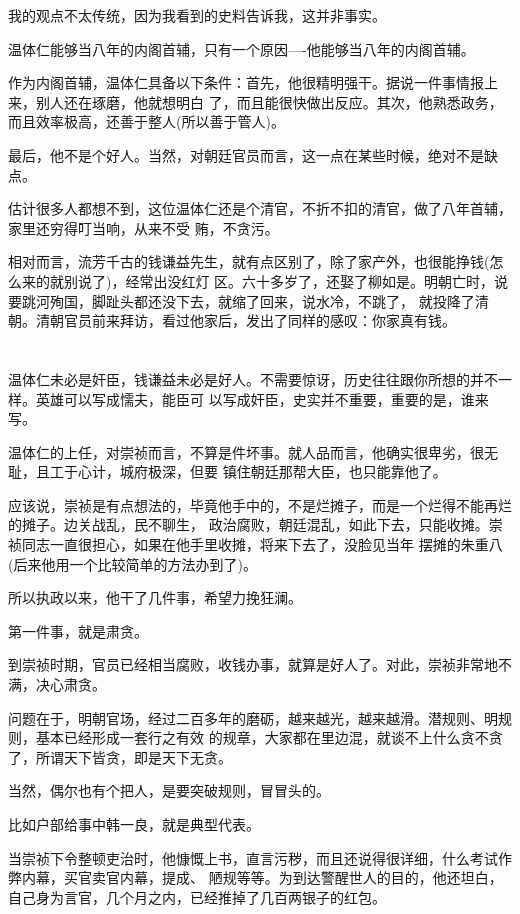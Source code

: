 \documentclass[11pt,a4paper,onecolumn]{article}
\begin{document}
我的观点不太传统，因为我看到的史料告诉我，这并非事实。

温体仁能够当八年的内阁首辅，只有一个原因----他能够当八年的内阁首辅。

作为内阁首辅，温体仁具备以下条件：首先，他很精明强干。据说一件事情报上来，别人还在琢磨，他就想明白
了，而且能很快做出反应。其次，他熟悉政务，而且效率极高，还善于整人(所以善于管人)。

最后，他不是个好人。当然，对朝廷官员而言，这一点在某些时候，绝对不是缺点。

估计很多人都想不到，这位温体仁还是个清官，不折不扣的清官，做了八年首辅，家里还穷得叮当响，从来不受
贿，不贪污。

相对而言，流芳千古的钱谦益先生，就有点区别了，除了家产外，也很能挣钱(怎么来的就别说了)，经常出没红灯
区。六十多岁了，还娶了柳如是。明朝亡时，说要跳河殉国，脚趾头都还没下去，就缩了回来，说水冷，不跳了，
就投降了清朝。清朝官员前来拜访，看过他家后，发出了同样的感叹：你家真有钱。

\section[\thesection]{}

温体仁未必是奸臣，钱谦益未必是好人。不需要惊讶，历史往往跟你所想的并不一样。英雄可以写成懦夫，能臣可
以写成奸臣，史实并不重要，重要的是，谁来写。

温体仁的上任，对崇祯而言，不算是件坏事。就人品而言，他确实很卑劣，很无耻，且工于心计，城府极深，但要
镇住朝廷那帮大臣，也只能靠他了。

应该说，崇祯是有点想法的，毕竟他手中的，不是烂摊子，而是一个烂得不能再烂的摊子。边关战乱，民不聊生，
政治腐败，朝廷混乱，如此下去，只能收摊。崇祯同志一直很担心，如果在他手里收摊，将来下去了，没脸见当年
摆摊的朱重八(后来他用一个比较简单的方法办到了)。

所以执政以来，他干了几件事，希望力挽狂澜。

第一件事，就是肃贪。

到崇祯时期，官员已经相当腐败，收钱办事，就算是好人了。对此，崇祯非常地不满，决心肃贪。

问题在于，明朝官场，经过二百多年的磨砺，越来越光，越来越滑。潜规则、明规则，基本已经形成一套行之有效
的规章，大家都在里边混，就谈不上什么贪不贪了，所谓天下皆贪，即是天下无贪。

当然，偶尔也有个把人，是要突破规则，冒冒头的。

比如户部给事中韩一良，就是典型代表。

当崇祯下令整顿吏治时，他慷慨上书，直言污秽，而且还说得很详细，什么考试作弊内幕，买官卖官内幕，提成、
陋规等等。为到达警醒世人的目的，他还坦白，自己身为言官，几个月之内，已经推掉了几百两银子的红包。
\end{document}
